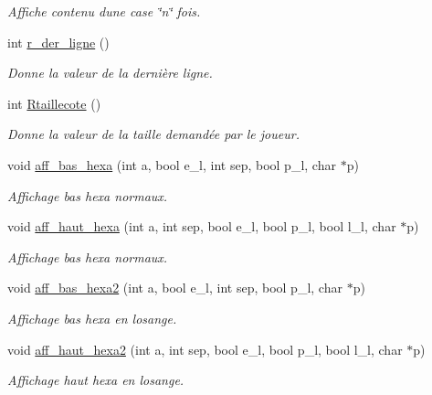 \begin{DoxyCompactItemize}
\begin{DoxyCompactList}\small\item\em Affiche contenu d\textquotesingle{}une case \char`\"{}n\char`\"{} fois. \end{DoxyCompactList}\item 
int \hyperlink{classplateau_a7dc94d2ffd474bd7871deb25d9af8091}{r\+\_\+der\+\_\+ligne} ()
\begin{DoxyCompactList}\small\item\em Donne la valeur de la dernière ligne. \end{DoxyCompactList}\item 
int \hyperlink{classplateau_ae9917aadf7efa09d855f98477da9e6f2}{Rtaillecote} ()
\begin{DoxyCompactList}\small\item\em Donne la valeur de la taille demandée par le joueur. \end{DoxyCompactList}\item 
void \hyperlink{classplateau_a9c40ed64826dc83cd9449d023121d9d7}{aff\+\_\+bas\+\_\+hexa} (int a, bool e\+\_\+l, int sep, bool p\+\_\+l, char $\ast$p)
\begin{DoxyCompactList}\small\item\em Affichage bas hexa normaux. \end{DoxyCompactList}\item 
void \hyperlink{classplateau_ae9f7525df363ec9eab150e6ed312207f}{aff\+\_\+haut\+\_\+hexa} (int a, int sep, bool e\+\_\+l, bool p\+\_\+l, bool l\+\_\+l, char $\ast$p)
\begin{DoxyCompactList}\small\item\em Affichage bas hexa normaux. \end{DoxyCompactList}\item 
void \hyperlink{classplateau_add9fec84a84fb5b4c101f2056fb7b6cc}{aff\+\_\+bas\+\_\+hexa2} (int a, bool e\+\_\+l, int sep, bool p\+\_\+l, char $\ast$p)
\begin{DoxyCompactList}\small\item\em Affichage bas hexa en losange. \end{DoxyCompactList}\item 
void \hyperlink{classplateau_ab720f7c75d770bf0d6381e080e7524b1}{aff\+\_\+haut\+\_\+hexa2} (int a, int sep, bool e\+\_\+l, bool p\+\_\+l, bool l\+\_\+l, char $\ast$p)
\begin{DoxyCompactList}\small\item\em Affichage haut hexa en losange. \end{DoxyCompactList}\item 

\end{DoxyCompactItemize}
